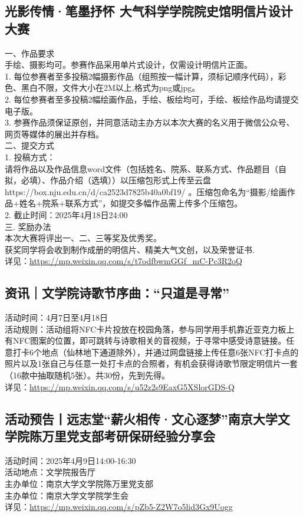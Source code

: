 \documentclass[letterpaper, 12pt]{article}
\begin{document}
\begin{multicols}{2}
\subsection{光影传情·笔墨抒怀 大气科学学院院史馆明信片设计大赛}
一、作品要求
\\手绘、摄影均可。参赛作品采用单片式设计，仅需设计明信片正面。
\\1. 每位参赛者至多投稿2幅摄影作品（组照按一幅计算，须标记顺序代码），彩色、黑白不限，文件大小在2M以上,格式为png或jpg。
\\2. 每位参赛者至多投稿2幅绘画作品，手绘、板绘均可，手绘、板绘作品均请提交电子版。
\\3. 参赛作品须保证原创，并同意活动主办方以本次大赛的名义用于微信公众号、网页等媒体的展出并存档。
\\二、提交方式
\\1. 投稿方式：
\\请将作品以及作品信息word文件（包括姓名、院系、联系方式、作品题目（自拟，必填）、作品介绍（选填））以压缩包形式上传至云盘
\\https://box.nju.edu.cn/d/ca2523d7825b40a0bf19/ 。压缩包命名为“摄影/绘画作品+姓名+院系+联系方式”，如提交多幅作品需上传多个压缩包。
\\2. 截止时间：2025年4月18日24:00
\\三. 奖励办法
\\本次大赛将评出一、二、三等奖及优秀奖。
\\获奖同学将会收到制作成册的明信片、精美大气文创，以及荣誉证书.
\\详见：\url{https://mp.weixin.qq.com/s/t7odfbwmGGf_mC-Pc3R2oQ}

\subsection{资讯｜文学院诗歌节序曲：“只道是寻常”}
活动时间：4月7日至4月18日
\\活动规则：活动组将NFC卡片投放在校园角落，参与同学用手机靠近亚克力板上有NFC图案的位置，即可跳转与诗歌相关的音视频，于寻常中感受诗意链接。任意打卡6个地点（仙林地下通道除外），并通过网盘链接上传任意6张NFC打卡点的照片以及1张自己与任意一处打卡点的合照者，有机会获得诗歌节限定明信片一套（16款中抽取随机5张）。共30份，先到先得。
\\详见：\url{https://mp.weixin.qq.com/s/u52z2s9EaxG5XSlorGDS-Q}

\subsection{活动预告丨远志堂“薪火相传·文心逐梦”南京大学文学院陈万里党支部考研保研经验分享会}
活动时间：2025年4月9日14:00-16:30
\\活动地点：文学院报告厅
\\主办单位：南京大学文学院陈万里党支部
\\主办单位：南京大学文学院学生会
\\详见：\url{https://mp.weixin.qq.com/s/pZb5-Z2W7o5lid3Gx9Uogg}




\end{multicols}
\end{document}
